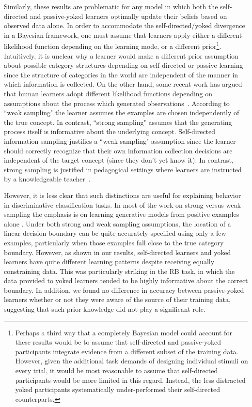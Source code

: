 \documentclass[3p,twocolumn,authoryear,10pt]{elsarticle}
\begin{document}
Similarly, these results are problematic for any model in which both the self-directed and passive-yoked learners optimally update their beliefs based on observed data alone.  In order to accommodate the self-directed/yoked divergence in a Bayesian framework, one must assume that learners apply either a different likelihood function depending on the learning mode, or a different prior\footnote{Perhaps a third way that a completely Bayesian model could account for these results would be to assume that self-directed and passive-yoked participants integrate evidence from a different subset of the training data.  However, given the additional task demands of designing individual stimuli on every trial, it would be most reasonable to assume that self-directed participants would be more limited in this regard. Instead, the less distracted yoked participants systematically under-performed their self-directed counterparts.}. 
Intuitively, it is unclear why a learner would make a different prior assumption about possible category structures depending on self-directed or passive learning since the structure of categories in the world are independent of the manner in which information is collected. On the other hand, some recent work has argued that human learners adopt different likelihood
functions depending on assumptions about the process which generated 
observations~\citep{Tenenbaum:1999ao,Tenenbaum:2001wq}. According to ``weak sampling" the learner assumes the examples are chosen independently of the true concept.  In contrast, ``strong sampling" assumes that the generating process itself is informative about the underlying concept.  Self-directed information sampling justifies a ``weak sampling" assumption since the learner should correctly recognize that their own information collection decisions are independent of the target concept (since they don't yet know it).  In contrast, strong sampling is justified in pedagogical settings where learners are  instructed by a knowledgeable teacher~\citep{Xu:2007rt,Xu:2007yq,Shafto:2008p6011,Gweon:2010nx}.

However, it is less clear that such distinctions
are useful for explaining behavior in discriminative classification tasks.  In most of the work on strong versus
weak sampling the emphasis is on learning generative models from positive examples alone \citep[c.f.][]{Tenenbaum:1999ao,Tenenbaum:2001wq,Xu:2007rt}.
Under both strong and weak sampling assumptions, the location of a linear decision boundary can be
quite accurately specified using only a few examples, particularly when those examples fall close
to the true category boundary.  However, as shown in our results, self-directed learners and
yoked learners have quite different learning patterns despite receiving equally constraining data. This was particularly striking in the RB task, in which the data provided to yoked learners tended to be highly informative about the correct boundary. In addition, we found no difference in accuracy between passive-yoked learners whether or not they were aware of the source of their training data, suggesting that such prior knowledge did not play a significant role.
\end{document}
